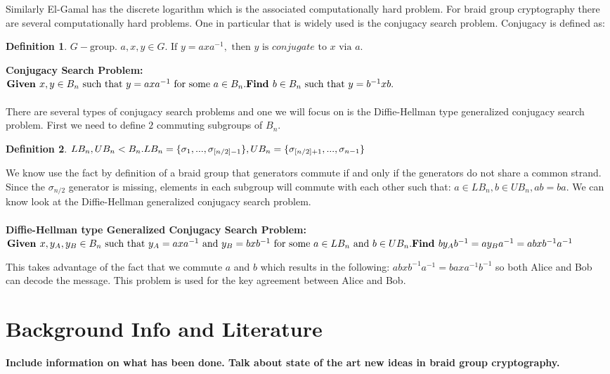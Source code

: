 \documentclass{article}
\theoremstyle{definition}
\newtheorem{definition}{Definition}[section]
\begin{document}
Similarly El-Gamal has the discrete logarithm which is the associated computationally hard problem. 
For braid group cryptography there are several computationally hard problems. One in particular that is widely used is the conjugacy search problem. Conjugacy is defined as:
\begin{definition} 
$G-\text{group. } a,x,y \in G. \text{ If }y=axa^{-1},\text{ then }y \text{ is } conjugate \text{ to }x \text{ via }a.$
\end{definition}

\noindent \textbf{Conjugacy Search Problem:} \\ $\textbf{Given }x,y \in B_n \text{ such that }y=axa^{-1} \text{ for some }a \in B_n. \\ \textbf{Find }b \in B_n \text{ such that }y=b^{-1}xb.$
\\ \\
There are several types of conjugacy search problems and one we will focus on is the Diffie-Hellman type generalized conjugacy search problem. First we need to define $2$ commuting subgroups of $B_n$. 


\begin{definition}
$LB_n,UB_n < B_n. \\ LB_n=\{ \sigma_1,...,\sigma_{[n/2]-1}  \}, UB_n=\{ \sigma_{[n/2]+1},...,\sigma_{n-1}  \} $
\end{definition}

We know use the fact by definition of a braid group that generators commute if and only if the generators do not share a common strand. Since the $\sigma_{n/2}$ generator is missing, elements in each subgroup will commute with each other such that: $a \in LB_n, b \in UB_n, ab=ba$. We can know look at the Diffie-Hellman generalized conjugacy search problem.
\\ \\
\textbf{Diffie-Hellman type Generalized Conjugacy Search Problem:} \\ $\textbf{Given }x,y_A, y_B \in B_n \text{ such that }y_A=axa^{-1} \text{ and } y_B=bxb^{-1} \text{ for some }a \in LB_n \text{ and }b \in UB_n. \\ \textbf{Find }by_Ab^{-1}=ay_Ba^{-1}=abxb^{-1}a^{-1}$

This takes advantage of the fact that we commute $a$ and $b$ which results in the following: $abxb^{-1}a^{-1}=baxa^{-1}b^{-1}$ so both Alice and Bob can decode the message. This problem is used for the key agreement between Alice and Bob.

\section{Background Info and Literature}
\textbf{Include information on what has been done. Talk about state of the art new ideas in braid group cryptography.}
\end{document}
